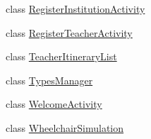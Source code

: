\begin{DoxyCompactItemize}
\item 
class \mbox{\hyperlink{classcom_1_1osoc_1_1oncera_1_1_register_institution_activity}{Register\+Institution\+Activity}}
\item 
class \mbox{\hyperlink{classcom_1_1osoc_1_1oncera_1_1_register_teacher_activity}{Register\+Teacher\+Activity}}
\item 
class \mbox{\hyperlink{classcom_1_1osoc_1_1oncera_1_1_teacher_itinerary_list}{Teacher\+Itinerary\+List}}
\item 
class \mbox{\hyperlink{classcom_1_1osoc_1_1oncera_1_1_types_manager}{Types\+Manager}}
\item 
class \mbox{\hyperlink{classcom_1_1osoc_1_1oncera_1_1_welcome_activity}{Welcome\+Activity}}
\item 
class \mbox{\hyperlink{classcom_1_1osoc_1_1oncera_1_1_wheelchair_simulation}{Wheelchair\+Simulation}}
\end{DoxyCompactItemize}
